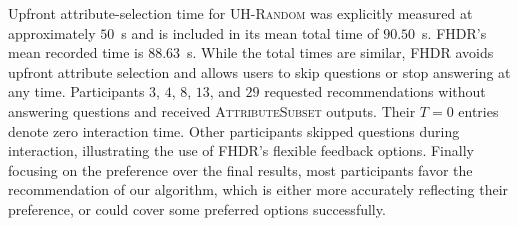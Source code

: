 Upfront attribute-selection time for \textsc{UH-Random} was explicitly measured at approximately $50$~s and is included in its mean total time of $90.50$~s. FHDR’s mean recorded time is $88.63$~s. While the total times are similar, FHDR avoids upfront attribute selection and allows users to skip questions or stop answering at any time. Participants $3$, $4$, $8$, $13$, and $29$ requested recommendations without answering questions and received \textsc{AttributeSubset} outputs. Their $T=0$ entries denote zero interaction time. Other participants skipped questions during interaction, illustrating the use of FHDR’s flexible feedback options. Finally focusing on the preference over the final results, most participants favor the recommendation of our algorithm, which is either more accurately reflecting their preference, or could cover some preferred options successfully.

